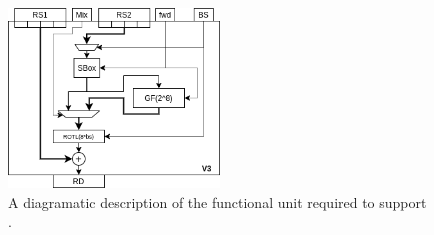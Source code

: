 \newpage

\begin{figure}[!h]
\centering
\includegraphics[width={0.5\textwidth}]{diagrams/ise-datapath-v3.png}
\caption{
  A diagramatic description of the functional unit required to support .
}
\label{fig:v3:fu}
\end{figure}

